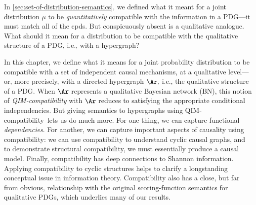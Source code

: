     \label{chap:QIM}
\newcommand\dotmodels{\mathbin{{\models}^{\mathllap{\bullet\,}}_{\vphantom{l}}}}
\newcommand\emodels{\mathbin{{\models}^{\mathllap{e\,}}_{\vphantom{l}}}}

\newcommand\PSEMs{\mathrm{PSEMs}}
\newcommand\PSEMsA{\mathrm{PSEMs}_{\!\Ar}}
\newcommand\Wits{\mathrm{Wits}}

\newcommand\muxor{\mu_{\mathit{xor}}}

\newcommand\hyperarc{hyperarc}
\newcommand\arc{hyperarc}
\newcommand\SQIM{QIM}%
\newcommand\scibility{\SQIM-compatibility}
\newcommand\Scibility{\SQIM-compatibility}
\newcommand\SCibility{\SQIM-Compatibility}

\newcommand\scible{\SQIM-compatible}
\newcommand\escible{E\scible}
\newcommand\cible{compatible}
\newcommand\cibility{compatibility}

\newcommand\partl{partitional}
\newcommand\subpartl{sub\partl}
\newcommand\unipartl{uni\partl}
\newcommand\suppartl{super\partl}
\newcommand\suppartlness{\suppartl ity}

\newcommand\hgraph{hypergraph}


In \cref{sec:set-of-distribution-semantics}, we defined what it meant
for a joint distribution $\mu$ to be \emph{quantitatively} compatible with the information in a PDG---it must match all of the cpds. 
But conspicuously absent is a qualitative analogue. 
What should it mean for a distribution to be compatible with the qualitative structure of a PDG, i.e., with a hypergraph?


In this chapter, we define what it means for a joint probability distribution to be 
compatible
with a set of independent causal mechanisms,
at a qualitative level---%
or, more precisely, with a directed hypergraph $\Ar$,
i.e., the qualitative structure of a PDG. 
When $\Ar$ represents a qualitative Bayesian network (BN), 
this notion of \emph{\scibility} with $\Ar$
reduces to satisfying the appropriate conditional independencies. 
But giving semantics to hypergraphs using \scibility\ lets us do much more.
For one thing, we can capture functional \emph{dependencies}.
For another, we can capture important aspects of causality using compatibility:
we can use compatibility to understand cyclic causal graphs, and
to demonstrate structural compatibility, we must 
essentially produce a causal model. 
Finally, compatibility has deep connections to 
Shannon information.
Applying compatibility to cyclic structures helps to clarify a
longstanding conceptual issue 
in information theory.
Compatibility also has a close, but far from obvious,
relationship with the original scoring-function semantics for
qualitative PDGs, 
which underlies many of our results.


